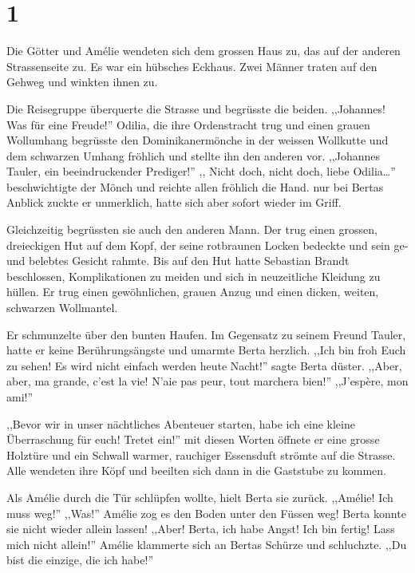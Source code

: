 \section*{1}

Die Götter und Amélie wendeten sich dem grossen Haus zu, das auf der anderen Strassenseite zu. Es war ein hübsches Eckhaus. Zwei Männer traten auf den Gehweg und winkten ihnen zu.

Die Reisegruppe überquerte die Strasse und begrüsste die beiden. ,,Johannes! Was für eine Freude!'' Odilia, die ihre Ordenstracht trug und einen grauen Wollumhang begrüsste den Dominikanermönche in der weissen Wollkutte und dem schwarzen Umhang fröhlich und stellte ihn den anderen vor. ,,Johannes Tauler, ein beeindruckender Prediger!'' ,, Nicht doch, nicht doch, liebe Odilia\dots '' beschwichtigte der Mönch und reichte allen fröhlich die Hand. nur bei Bertas Anblick zuckte er unmerklich, hatte sich aber sofort wieder im Griff.

Gleichzeitig begrüssten sie auch den anderen Mann. Der trug einen grossen, dreieckigen Hut auf dem Kopf, der seine rotbraunen Locken bedeckte und sein ge- und belebtes Gesicht rahmte. Bis auf den Hut hatte Sebastian Brandt beschlossen, Komplikationen zu meiden und sich in neuzeitliche Kleidung zu hüllen. Er trug einen gewöhnlichen, grauen Anzug und einen dicken, weiten, schwarzen Wollmantel. 

Er schmunzelte über den bunten Haufen. Im Gegensatz zu seinem Freund Tauler, hatte er keine Berührungsängste und umarmte Berta herzlich. ,,Ich bin froh Euch zu sehen! Es wird nicht einfach werden heute Nacht!'' sagte Berta düster. ,,Aber, aber, ma grande, c'est la vie! N'aie pas peur, tout marchera bien!'' ,,J'espère, mon ami!''

,,Bevor wir in unser nächtliches Abenteuer starten, habe ich eine kleine Überraschung für euch! Tretet ein!'' mit diesen Worten öffnete er eine grosse Holztüre und ein Schwall warmer, rauchiger Essensduft strömte auf die Strasse. Alle wendeten ihre Köpf und beeilten sich dann in die Gaststube zu kommen.

Als Amélie durch die Tür schlüpfen wollte, hielt Berta sie zurück. ,,Amélie! Ich muss weg!'' ,,Was!'' Amélie zog es den Boden unter den Füssen weg! Berta konnte sie nicht wieder allein lassen! ,,Aber! Berta, ich habe Angst! Ich bin fertig! Lass mich nicht allein!'' Amélie klammerte sich an Bertas Schürze und schluchzte. ,,Du bist die einzige, die ich habe!''


